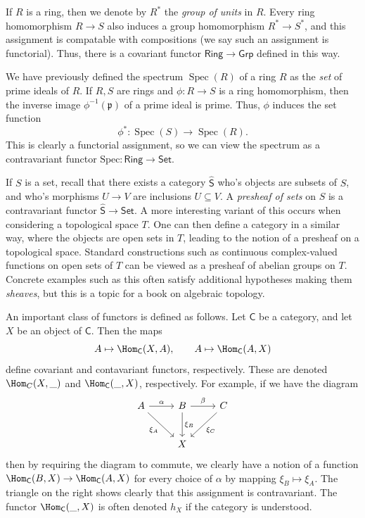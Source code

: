 If $R$ is a ring, then we denote by $R^*$ the \emph{group of units} in $R$. Every ring homomorphism $R\to S$ also induces a group homomorphism $R^*\to S^*$, and this assignment is compatable with compositions (we say such an assignment is functorial). Thus, there is a covariant functor $\mathsf{Ring} \to \mathsf{Grp} $ defined in this way.

We have previously defined the spectrum $\operatorname{Spec} (R)$ of a ring $R$ as the \emph{set} of prime ideals of $R$. If $R,S$ are rings and $\phi : R \to S$ is a ring homomorphism, then the inverse image $\phi ^{-1} (\mathfrak{p} )$ of a prime ideal is prime. Thus, $\phi $ induces the set function
\[
	\phi^* : \operatorname{Spec} (S) \to \operatorname{Spec} (R)
.\]
This is clearly a functorial assignment, so we can view the spectrum as a contravariant functor $\mathrm{Spec} : \mathsf{Ring}  \to \mathsf{Set} $.

If $S$ is a set, recall that there exists a category $\mathsf{\hat{S} } $ who's objects are subsets of $S$, and who's morphisms $U\to V$ are inclusions $U\subseteq V$. A \emph{presheaf of sets} on $S$ is a contravariant functor $\mathsf{\hat{S} } \to \mathsf{Set} $. A more interesting variant of this occurs when considering a topological space $T$. One can then define a category in a similar way, where the objects are open sets in $T$, leading to the notion of a presheaf on a topological space. Standard constructions such as continuous complex-valued functions on open sets of $T$ can be viewed as a presheaf of abelian groups on $T$. Concrete examples such as this often satisfy additional hypotheses making them \emph{sheaves}, but this is a topic for a book on algebraic topology.

An important class of functors is defined as follows. Let $\mathsf{C} $ be a category, and let $X$ be an object of $\mathsf{C} $. Then the maps
\[
	A\mapsto \Hom_{\mathsf{C} }(X, A) ,\qquad A\mapsto \Hom_{\mathsf{C} }(A, X) 
\]
define covariant and contavariant functors, respectively. These are denoted $\Hom_{C}(X, \_) $ and $\Hom_{\mathsf{C} }(\_, X) $, respectively. For example, if we have the diagram
\[\begin{tikzcd}[row sep = 2.5em, column sep = 2.5em]
	A\arrow[r, "\alpha "]\arrow[dr, "\xi_A"']&B\arrow[r, "\beta "]\arrow[d, "\xi_B"]&C\arrow[dl, "\xi_C"]\\
			     &X
\end{tikzcd}\]
then by requiring the diagram to commute, we clearly have a notion of a function $\Hom_{\mathsf{C} }(B, X) \to \Hom_{\mathsf{C} }(A, X) $ for every choice of $\alpha $ by mapping $\xi_B\mapsto  \xi _A$. The triangle on the right shows clearly that this assignment is contravariant. The functor $\Hom_{\mathsf{C} }(\_, X) $ is often denoted $h_X$ if the category is understood.

